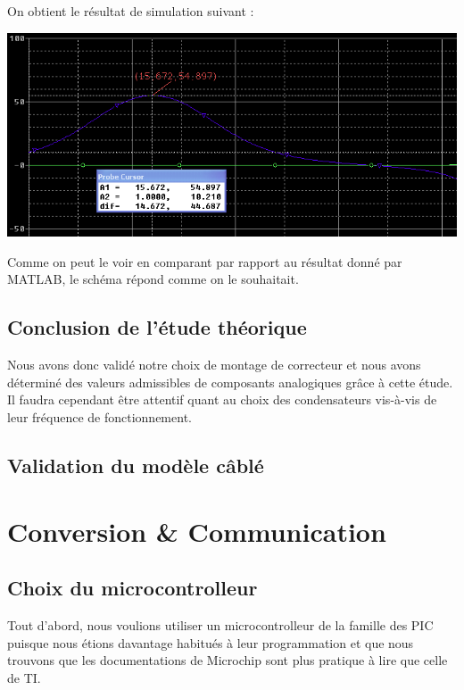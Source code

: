 \documentclass[11pt, french]{article} %
\begin{document}
On obtient le résultat de simulation suivant : 

\begin{center}
\includegraphics[width = 15cm]{SolutionAnalogique/simuAvph.png} 
\end{center}

Comme on peut le voir en comparant par rapport au résultat donné par MATLAB, le schéma répond comme on le souhaitait. 

\vspace{0.5cm}
\subsection{Conclusion de l'étude théorique}

\noindent
Nous avons donc validé notre choix de montage de correcteur et nous avons déterminé des valeurs admissibles de composants analogiques grâce à cette étude. Il faudra cependant être attentif quant au choix des condensateurs vis-à-vis de leur fréquence de fonctionnement.  

\subsection{Validation du modèle câblé}


\section{Conversion \& Communication}
\subsection{Choix du microcontrolleur}

Tout d'abord, nous voulions utiliser un microcontrolleur de la famille des PIC puisque nous étions davantage habitués à leur programmation et que nous trouvons que les documentations de Microchip sont plus pratique à lire que celle de TI.  %
\end{document}
